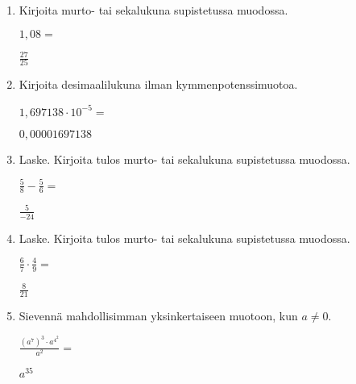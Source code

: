 \documentclass[finnish, a4paper, 12pt]{article}
\begin{document}
	\begin{enumerate}[leftmargin=*]
		\setlength\itemsep{1em}
		
		\item %
		Kirjoita murto- tai sekalukuna supistetussa muodossa. 
		
		\(
		1{,}08 = 
		\) %
		
		\begin{version:withAnswers}
		\( \frac{27}{25} \)
		\end{version:withAnswers}

		\vspace{8pt}
		
		\item %
		Kirjoita desimaalilukuna ilman kymmenpotenssimuotoa. 
		
		\(
		1{,}697138\cdot 10^{-5} = 
		\) %
		\begin{version:withAnswers}
		\( 0,00001697138 \)
		\end{version:withAnswers}	
		\vspace{8pt}
		
		\item %
		Laske. Kirjoita tulos murto- tai sekalukuna supistetussa muodossa.
		
		\(
		\displaystyle
		\frac{5}{8}-\frac{5}{6} = 
		\) %
		\begin{version:withAnswers}
		\( \frac{5}{-24} \)
		\end{version:withAnswers}	
		
		\vspace{8pt}
		
		\item %
		Laske. Kirjoita tulos murto- tai sekalukuna supistetussa muodossa.
		
		\(
		\displaystyle
		\frac{6}{7}\cdot\frac{4}{9} = 
		\) %
		\begin{version:withAnswers}
		\( \frac{8}{21} \)
		\end{version:withAnswers}
		
		\vspace{8pt}
		
		\item %
		Sievennä mahdollisimman yksinkertaiseen muotoon, kun \(a \not = 0\). 
		
		\(
		\displaystyle
		\frac{\left(a^7\right)^3 \cdot a^{4^2}}{a^2} =
		\phantom{mmmmmmmmmmmmmmm}
		\) %
		\begin{version:withAnswers}
		\(  a^{35} \)
		\end{version:withAnswers}
		

\end{enumerate}
\end{document}
